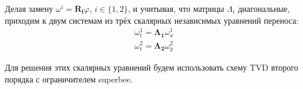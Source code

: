 \documentclass[12pt,a4paper]{article}
\begin{document}
Делая замену $\omega^i =  \bm{R_i} \varphi$, $i\in\{1,2\}$, и учитывая, что матрицы $\Lambda_i$ диагональные, приходим к двум системам из трёх скалярных независимых уравнений переноса:
\begin{gather}
	\omega^1_t = \bm{\Lambda_1} \omega^1_x\\
	\omega^2_t = \bm{\Lambda_2} \omega^2_y
\end{gather}

Для решения этих скалярных уравнений будем использовать схему TVD второго порядка с ограничителем superbee.




\end{document}
